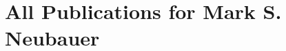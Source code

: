 \documentclass{arcpubs}
\begin{document}
\section*{All Publications for Mark S. Neubauer}

\nocite{*}
\showbooks
\showchapters
\showarticles
\showproceedings

\end{document}
